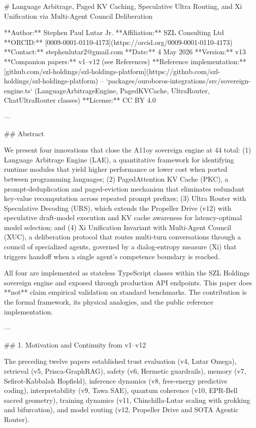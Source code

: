 # Language Arbitrage, Paged KV Caching, Speculative Ultra Routing, and Xi Unification via Multi-Agent Council Deliberation

**Author:** Stephen Paul Lutar Jr.
**Affiliation:** SZL Consulting Ltd
**ORCID:** [0009-0001-0110-4173](https://orcid.org/0009-0001-0110-4173)
**Contact:** stephenlutar2@gmail.com
**Date:** 4 May 2026
**Version:** v13
**Companion papers:** v1--v12 (see References)
**Reference implementation:** [github.com/szl-holdings/szl-holdings-platform](https://github.com/szl-holdings/szl-holdings-platform) -- `packages/ouroboros-integrations/src/sovereign-engine.ts` (LanguageArbitrageEngine, PagedKVCache, UltraRouter, ChatUltraRouter classes)
**License:** CC BY 4.0

---

## Abstract

We present four innovations that close the A11oy sovereign engine at 44 total: (1) Language Arbitrage Engine (LAE), a quantitative framework for identifying runtime modules that yield higher performance or lower cost when ported between programming languages; (2) PagedAttention KV Cache (PKC), a prompt-deduplication and paged-eviction mechanism that eliminates redundant key-value recomputation across repeated prompt prefixes; (3) Ultra Router with Speculative Decoding (URS), which extends the Propeller Drive (v12) with speculative draft-model execution and KV cache awareness for latency-optimal model selection; and (4) Xi Unification Invariant with Multi-Agent Council (XUC), a deliberation protocol that routes multi-turn conversations through a council of specialized agents, governed by a dialog-entropy measure (Xi) that triggers handoff when a single agent's competence boundary is reached.

All four are implemented as stateless TypeScript classes within the SZL Holdings sovereign engine and exposed through production API endpoints. This paper does **not** claim empirical validation on standard benchmarks. The contribution is the formal framework, its physical analogies, and the public reference implementation.

---

## 1. Motivation and Continuity from v1--v12

The preceding twelve papers established trust evaluation (v4, Lutar Omega), retrieval (v5, Prisca-GraphRAG), safety (v6, Hermetic guardrails), memory (v7, Sefirot-Kabbalah Hopfield), inference dynamics (v8, free-energy predictive coding), interpretability (v9, Tawa SAE), quantum coherence (v10, EPR-Bell sacred geometry), training dynamics (v11, Chinchilla-Lutar scaling with grokking and bifurcation), and model routing (v12, Propeller Drive and SOTA Agentic Router).

